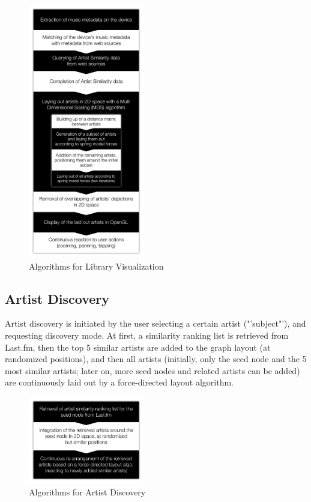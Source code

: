 \begin{figure}[H]
  \centering
    \includegraphics[width=0.45\textwidth]{figures/algorithm_flow_visualization}
  \caption{Algorithms for Library Visualization}
  \label{fig:algorithm_flow_visualization}
\end{figure}

\subsection{Artist Discovery}

Artist discovery is initiated by the user selecting a certain artist ("'subject"'), and requesting discovery mode. At first, a similarity ranking list is retrieved from Last.fm, then the top 5 similar artists are added to the graph layout (at randomized positions), and then all artists (initially, only the seed node and the 5 most similar artists; later on, more seed nodes and related artists can be added) are continuously laid out by a force-directed layout algorithm.

\begin{figure}[H]
  \centering
    \includegraphics[width=0.45\textwidth]{figures/algorithm_flow_artist_discovery}
  \caption{Algorithms for Artist Discovery}
  \label{fig:algorithm_flow_artist_discovery}
\end{figure}

